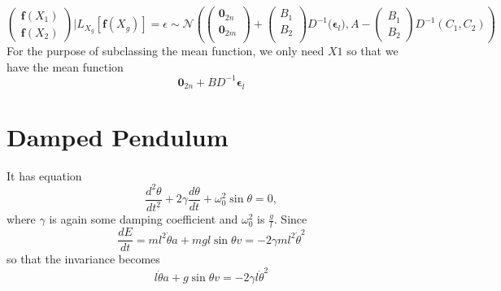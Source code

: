 \documentclass{article}
\begin{document}
$$
\begin{pmatrix}
  \mathbf{f}(X_1)\\
  \mathbf{f}(X_2)
\end{pmatrix}|L_{X_g}[\mathbf{f}(X_g)]=\epsilon
\sim\mathcal{N}
\left(
\begin{pmatrix}
  \mathbf{0}_{2n}\\
  \mathbf{0}_{2m}\\
\end{pmatrix}
+
\begin{pmatrix}
  B_1\\B_2\\
\end{pmatrix}
D^{-1}
\bigg(\mathbf{\epsilon}_l\bigg)
,
A-\begin{pmatrix}
  B_1 \\B_2
\end{pmatrix}D^{-1}\left(C_1, C_2\right)
\right)
$$
For the purpose of subclassing the mean function, we only need $X1$ so that we have the mean function $$\mathbf{0}_{2n}+BD^{-1}\mathbf{\epsilon}_l$$
\section*{Damped Pendulum}
It has equation
$$
\frac{d^2\theta}{dt^2} + 2\gamma\frac{d\theta}{dt} + \omega_0^2\sin\theta = 0, 
$$
where $\gamma$ is again some damping coefficient and $\omega_0^2$ is $\frac{g}{l}$.
Since 
$$
\frac{dE}{dt} = ml^2\dot{\theta}a+mgl\sin\theta v = -2\gamma ml^2\dot{\theta}^2
$$
so that the invariance becomes 
$$
l\dot{\theta}a+g\sin\theta v = -2\gamma l\dot{\theta}^2
$$
\end{document}
